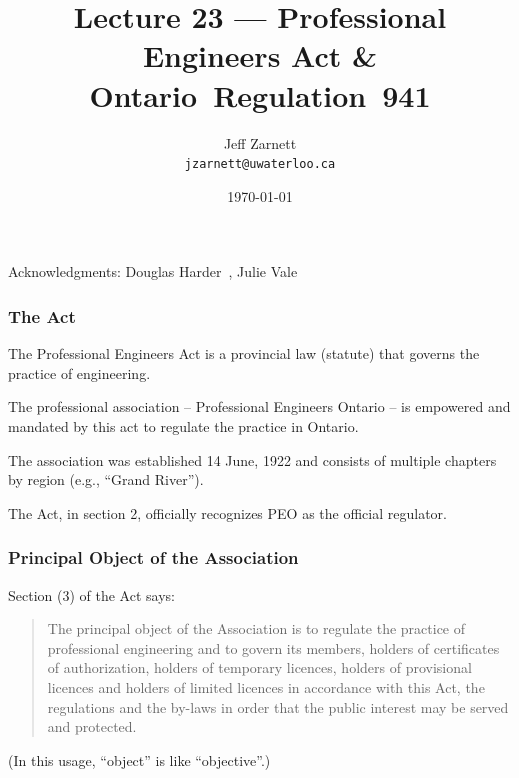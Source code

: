 

\title{Lecture 23 --- Professional Engineers Act \& Ontario~Regulation~941 }

\author{Jeff Zarnett \\ \small \texttt{jzarnett@uwaterloo.ca}}
\date{\today}




\begin{frame}
  \titlepage

\begin{center}
  \small{Acknowledgments: Douglas Harder~\cite{dwh}, Julie Vale~\cite{jv}}
  \end{center}
\end{frame}



\begin{frame}
\frametitle{The Act}

The Professional Engineers Act is a provincial law (statute) that governs the practice of engineering.

The professional association -- Professional Engineers Ontario -- is empowered and mandated by this act to regulate the practice in Ontario.

The association was established 14 June, 1922 and consists of multiple chapters by region (e.g., ``Grand River'').

The Act, in section 2, officially recognizes PEO as the official regulator.

\end{frame}


\begin{frame}
\frametitle{Principal Object of the Association}

Section (3) of the Act says:

\begin{quote}
The principal object of the Association is to regulate the practice of professional engineering and to govern its members, holders of certificates of authorization, holders of temporary licences, holders of provisional licences and holders of limited licences in accordance with this Act, the regulations and the by-laws in order that the public interest may be served and protected. 
\end{quote}

(In this usage, ``object'' is like ``objective''.)

\end{frame}



